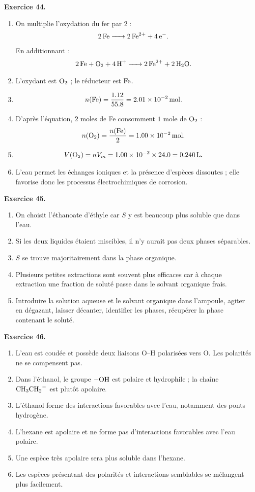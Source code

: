 \documentclass[11pt,a4paper]{article}
\newcommand{\corr}[2]{
  \begin{correctionbox}
  \textbf{Exercice #1.} #2
  \end{correctionbox}
}
\begin{document}
\corr{44}{
\begin{enumerate}
  \item On multiplie l'oxydation du fer par 2 :
  \[
  \ce{2Fe -> 2Fe^{2+} + 4e-}.
  \]
  En additionnant :
  \[
  \ce{2Fe + O2 + 4H+ -> 2Fe^{2+} + 2H2O}.
  \]
  \item L'oxydant est $\ce{O2}$ ; le réducteur est $\ce{Fe}$.
  \item
  \[
  n(\ce{Fe})=\frac{1.12}{55.8}=\SI{2.01e-2}{mol}.
  \]
  \item D'après l'équation, $2$ moles de Fe consomment $1$ mole de $\ce{O2}$ :
  \[
  n(\ce{O2})=\frac{n(\ce{Fe})}{2}=\SI{1.00e-2}{mol}.
  \]
  \item
  \[
  V(\ce{O2})=nV_m=1.00\times 10^{-2}\times 24.0=\SI{0.240}{L}.
  \]
  \item L'eau permet les échanges ioniques et la présence d'espèces dissoutes ; elle favorise donc les processus électrochimiques de corrosion.
\end{enumerate}
}

\corr{45}{
\begin{enumerate}
  \item On choisit l'éthanoate d'éthyle car $S$ y est beaucoup plus soluble que dans l'eau.
  \item Si les deux liquides étaient miscibles, il n'y aurait pas deux phases séparables.
  \item $S$ se trouve majoritairement dans la phase organique.
  \item Plusieurs petites extractions sont souvent plus efficaces car à chaque extraction une fraction de soluté passe dans le solvant organique frais.
  \item Introduire la solution aqueuse et le solvant organique dans l'ampoule, agiter en dégazant, laisser décanter, identifier les phases, récupérer la phase contenant le soluté.
\end{enumerate}
}

\corr{46}{
\begin{enumerate}
  \item L'eau est coudée et possède deux liaisons O--H polarisées vers O. Les polarités ne se compensent pas.
  \item Dans l'éthanol, le groupe $-\ce{OH}$ est polaire et hydrophile ; la chaîne $\ce{CH3CH2-}$ est plutôt apolaire.
  \item L'éthanol forme des interactions favorables avec l'eau, notamment des ponts hydrogène.
  \item L'hexane est apolaire et ne forme pas d'interactions favorables avec l'eau polaire.
  \item Une espèce très apolaire sera plus soluble dans l'hexane.
  \item Les espèces présentant des polarités et interactions semblables se mélangent plus facilement.
\end{enumerate}
}
\end{document}
